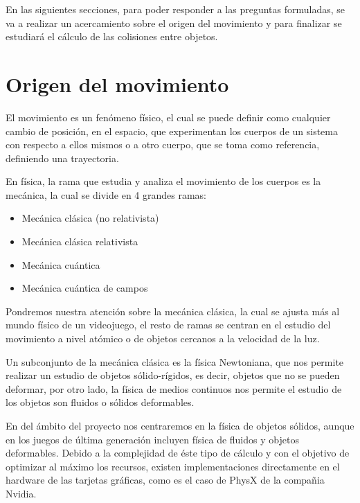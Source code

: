 En las siguientes secciones, para poder responder a las preguntas formuladas, se va a realizar un acercamiento sobre el origen del movimiento y para finalizar se estudiará el cálculo de las colisiones entre objetos.


\section{Origen del movimiento}

El movimiento es un fenómeno físico, el cual se puede definir como cualquier cambio de posición, en el espacio, que experimentan los cuerpos de un sistema con respecto a ellos mismos o a otro cuerpo, que se toma como referencia, definiendo una trayectoria.
\newline

En física, la rama que estudia y analiza el movimiento de los cuerpos es la mecánica, la cual se divide en 4 grandes ramas:
\begin{itemize}
\item Mecánica clásica (no relativista)
\item Mecánica clásica relativista
\item Mecánica cuántica 
\item Mecánica cuántica de campos
\end{itemize}

Pondremos nuestra atención sobre la mecánica clásica, la cual se ajusta más al mundo físico de un videojuego, el resto de ramas se centran en el estudio del movimiento a nivel atómico o de objetos cercanos a la velocidad de la luz.
\newline

Un subconjunto de la mecánica clásica es la física Newtoniana, que nos permite realizar un estudio de objetos sólido-rígidos, es decir, objetos que no se pueden deformar, por otro lado, la física de medios continuos nos permite el estudio de los objetos son fluidos o sólidos deformables.
\newline

En del ámbito del proyecto nos centraremos en la física de objetos sólidos, aunque en los juegos de última generación incluyen física de fluidos y objetos deformables. Debido a la complejidad de éste tipo de cálculo y con el objetivo de optimizar al máximo los recursos, existen implementaciones directamente en el hardware de las tarjetas gráficas, como es el caso de PhysX de la compañia Nvidia. 
\newline

